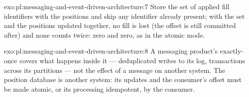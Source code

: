 \begin{solution}{exo:pl:messaging-and-event-driven-architecture:7}
Store the set of applied fill identifiers with the positions and skip any identifier already present; with the set and the positions updated
together, no fill is lost (the offset is still committed after) and none counts twice: zero and zero, as in the atomic mode.
\end{solution}

\begin{solution}{exo:pl:messaging-and-event-driven-architecture:8}
A messaging product's exactly-once covers what happens inside it --- deduplicated writes to its log, transactions across its partitions ---
not the effect of a message on another system. The position database is another system: its updates and the consumer's offset must be made
atomic, or its processing idempotent, by the consumer.
\end{solution}

